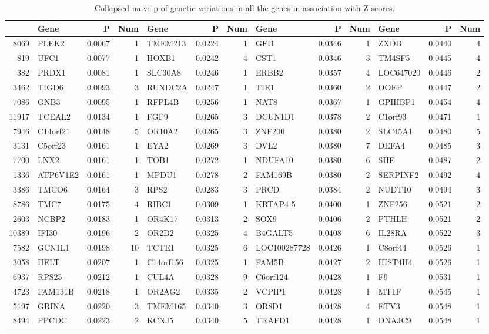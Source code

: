\documentclass{article}
\begin{document}
\begin{table}[tbp]
\centering
\caption{Collapsed naive p of genetic variations in all the genes in association with Z scores.} 
\label{tab:lowPall}
{\tiny
\begin{tabular}{rlrrlrrlrrlrr}
  \hline
 & Gene & P & Num & Gene & P & Num & Gene & P & Num & Gene & P & Num \\ 
  \hline
8069 & PLEK2 & 0.0067 & 1 & TMEM213 & 0.0224 & 1 & GFI1 & 0.0346 & 1 & ZXDB & 0.0440 & 4 \\ 
  819 & UFC1 & 0.0077 & 1 & HOXB1 & 0.0242 & 4 & CST1 & 0.0346 & 3 & TM4SF5 & 0.0445 & 4 \\ 
  382 & PRDX1 & 0.0081 & 1 & SLC30A8 & 0.0246 & 1 & ERBB2 & 0.0357 & 4 & LOC647020 & 0.0446 & 2 \\ 
  3462 & TIGD6 & 0.0093 & 3 & RUNDC2A & 0.0247 & 1 & TIE1 & 0.0360 & 2 & OOEP & 0.0447 & 2 \\ 
  7086 & GNB3 & 0.0095 & 1 & RFPL4B & 0.0256 & 1 & NAT8 & 0.0367 & 1 & GPIHBP1 & 0.0454 & 4 \\ 
  11917 & TCEAL2 & 0.0134 & 1 & FGF9 & 0.0265 & 3 & DCUN1D1 & 0.0378 & 2 & C1orf93 & 0.0471 & 1 \\ 
  7946 & C14orf21 & 0.0148 & 5 & OR10A2 & 0.0265 & 3 & ZNF200 & 0.0380 & 2 & SLC45A1 & 0.0480 & 5 \\ 
  3131 & C5orf23 & 0.0161 & 1 & EYA2 & 0.0269 & 3 & DVL2 & 0.0380 & 7 & DEFA4 & 0.0485 & 3 \\ 
  7700 & LNX2 & 0.0161 & 1 & TOB1 & 0.0272 & 1 & NDUFA10 & 0.0380 & 6 & SHE & 0.0487 & 2 \\ 
  1336 & ATP6V1E2 & 0.0161 & 1 & MPDU1 & 0.0278 & 2 & FAM169B & 0.0380 & 2 & SERPINF2 & 0.0492 & 4 \\ 
  3386 & TMCO6 & 0.0164 & 3 & RPS2 & 0.0283 & 3 & PRCD & 0.0384 & 2 & NUDT10 & 0.0494 & 3 \\ 
  8786 & TMC7 & 0.0175 & 4 & RIBC1 & 0.0309 & 1 & KRTAP4-5 & 0.0400 & 1 & ZNF256 & 0.0521 & 2 \\ 
  2603 & NCBP2 & 0.0183 & 1 & OR4K17 & 0.0313 & 2 & SOX9 & 0.0406 & 2 & PTHLH & 0.0521 & 2 \\ 
  10389 & IFI30 & 0.0196 & 2 & OR2D2 & 0.0325 & 4 & B4GALT5 & 0.0408 & 6 & IL28RA & 0.0522 & 3 \\ 
  7582 & GCN1L1 & 0.0198 & 10 & TCTE1 & 0.0325 & 6 & LOC100287728 & 0.0426 & 1 & C8orf44 & 0.0526 & 1 \\ 
  3058 & HELT & 0.0207 & 1 & C14orf156 & 0.0325 & 1 & FAM5B & 0.0427 & 2 & HIST4H4 & 0.0526 & 1 \\ 
  6937 & RPS25 & 0.0212 & 1 & CUL4A & 0.0328 & 9 & C6orf124 & 0.0428 & 1 & F9 & 0.0531 & 1 \\ 
  4723 & FAM131B & 0.0218 & 1 & OR2AG2 & 0.0335 & 2 & VCPIP1 & 0.0428 & 1 & MT1F & 0.0545 & 1 \\ 
  5197 & GRINA & 0.0220 & 3 & TMEM165 & 0.0340 & 3 & OR8D1 & 0.0428 & 4 & ETV3 & 0.0548 & 1 \\ 
  8494 & PPCDC & 0.0223 & 2 & KCNJ5 & 0.0340 & 5 & TRAFD1 & 0.0428 & 1 & DNAJC9 & 0.0548 & 1 \\ 
   \hline
\end{tabular}
}
\end{table}
\end{document}
